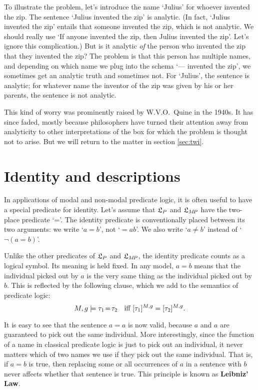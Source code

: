 To illustrate the problem, let's introduce the name `Julius' for whoever
invented the zip. The sentence `Julius invented the zip' is analytic. (In fact,
`Julius invented the zip' entails that someone invented the zip, which is not
analytic. We should really use `If anyone invented the zip, then Julius invented
the zip'. Let's ignore this complication.) But is it analytic \emph{of} the
person who invented the zip that they invented the zip? The problem is that this
person has multiple names, and depending on which name we plug into the schema
`--- invented the zip', we sometimes get an analytic truth and sometimes not.
For `Julius', the sentence is analytic; for whatever name the inventor of the
zip was given by his or her parents, the sentence is not analytic.

This kind of worry was prominently raised by W.V.O.\ Quine in the 1940s.  It has
since faded, mostly because philosophers have turned their attention away from
analyticity to other interpretations of the box for which the problem is thought
not to arise. But we will return to the matter in section \ref{sec:twi}.


\section{Identity and descriptions}
\label{sec:identity}

In applications of modal and non-modal predicate logic, it is often useful to
have a special predicate for identity. Let's assume that $\mathfrak{L}_P$ and $\mathfrak{L}_{M\!P}$
have the two-place predicate `='. The identity predicate is conventionally
placed between its two arguments: we write `$a=b$', not `$=\!ab$'. We also write
`$a\not=b$' instead of `$\neg(a\!=\!b)$'.

Unlike the other predicates of $\mathfrak{L}_P$ and $\mathfrak{L}_{M\!P}$, the identity predicate
counts as a logical symbol. Its meaning is held fixed. In any model, $a=b$
means that the individual picked out by $a$ is the very same thing as the
individual picked out by $b$. This is reflected by the following clause, which
we add to the semantics of predicate logic:
\[
  M,g \models \tau_1\!=\!\tau_2\text{ \; iff }[\tau_1]^{M,g} = [\tau_2]^{M,g}.
\]

It is easy to see that the sentence $a=a$ is now valid, because $a$ and $a$ are
guaranteed to pick out the same individual. More interestingly, since the
function of a name in classical predicate logic is just to pick out an
individual, it never matters which of two names we use if they pick out the same
individual. That is, if $a=b$ is true, then replacing some or all occurrences of
$a$ in a sentence with $b$ never affects whether that sentence is true. This
principle is known as \textbf{Leibniz' Law}.

